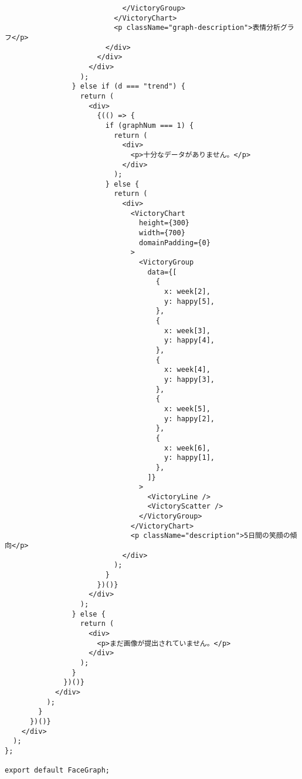 \begin{verbatim}
                            </VictoryGroup>
                          </VictoryChart>
                          <p className="graph-description">表情分析グラフ</p>
                        </div>
                      </div>
                    </div>
                  );
                } else if (d === "trend") {
                  return (
                    <div>
                      {(() => {
                        if (graphNum === 1) {
                          return (
                            <div>
                              <p>十分なデータがありません。</p>
                            </div>
                          );
                        } else {
                          return (
                            <div>
                              <VictoryChart
                                height={300}
                                width={700}
                                domainPadding={0}
                              >
                                <VictoryGroup
                                  data={[
                                    {
                                      x: week[2],
                                      y: happy[5],
                                    },
                                    {
                                      x: week[3],
                                      y: happy[4],
                                    },
                                    {
                                      x: week[4],
                                      y: happy[3],
                                    },
                                    {
                                      x: week[5],
                                      y: happy[2],
                                    },
                                    {
                                      x: week[6],
                                      y: happy[1],
                                    },
                                  ]}
                                >
                                  <VictoryLine />
                                  <VictoryScatter />
                                </VictoryGroup>
                              </VictoryChart>
                              <p className="description">5日間の笑顔の傾向</p>
                            </div>
                          );
                        }
                      })()}
                    </div>
                  );
                } else {
                  return (
                    <div>
                      <p>まだ画像が提出されていません。</p>
                    </div>
                  );
                }
              })()}
            </div>
          );
        }
      })()}
    </div>
  );
};

export default FaceGraph;

\end{verbatim}